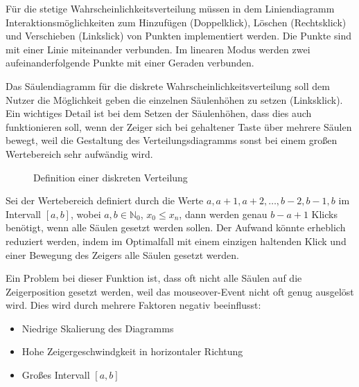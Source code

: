 Für die stetige Wahrscheinlichkeitsverteilung müssen in dem Liniendiagramm Interaktionsmöglichkeiten zum Hinzufügen (Doppelklick), Löschen (Rechtsklick) und Verschieben (Linkslick) von Punkten implementiert werden. Die Punkte sind mit einer Linie miteinander verbunden. Im linearen Modus werden zwei aufeinanderfolgende Punkte mit einer Geraden verbunden.

Das Säulendiagramm für die diskrete Wahrscheinlichkeitsverteilung soll dem Nutzer die Möglichkeit geben die einzelnen Säulenhöhen zu setzen (Linksklick). Ein wichtiges Detail ist bei dem Setzen der Säulenhöhen, dass dies auch funktionieren soll, wenn der Zeiger sich bei gehaltener Taste über mehrere Säulen bewegt, weil die Gestaltung des Verteilungsdiagramms sonst bei einem großen Wertebereich sehr aufwändig wird. 

\begin{figure}[H]
    \center
    \caption{Definition einer diskreten Verteilung}
\end{figure}

Sei der Wertebereich definiert durch die Werte $a,a+1,a+2,\dots,b-2,b-1,b$ im Intervall $[a,b]$, wobei $a,b \in\mathbb{N}_0$, $x_0 \le x_n$, dann werden genau $b-a+1$ Klicks benötigt, wenn alle Säulen gesetzt werden sollen. Der Aufwand könnte erheblich reduziert werden, indem im Optimalfall mit einem einzigen haltenden Klick und einer Bewegung des Zeigers alle Säulen gesetzt werden.

Ein Problem bei dieser Funktion ist, dass oft nicht alle Säulen auf die Zeigerposition gesetzt werden, weil das mouseover-Event nicht oft genug ausgelöst wird. Dies wird durch mehrere Faktoren negativ beeinflusst:
\begin{itemize}
    \item Niedrige Skalierung des Diagramms
    \item Hohe Zeigergeschwindgkeit in horizontaler Richtung
    \item Großes Intervall $[a,b]$
 \end{itemize}

